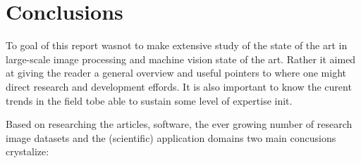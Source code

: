 \section{Conclusions}
\label{sec:conc}

To goal of  this report wasnot to make extensive study of the state of the art in large-scale image processing and machine vision state of the art. Rather it aimed at giving the reader a general overview and useful pointers to where one might direct research and development effords. It is also important to know the curent trends in the field tobe able to sustain some level of expertise init.

Based on researching the articles, software, the ever growing number of research image datasets and the (scientific) application domains two main concusions crystalize:

